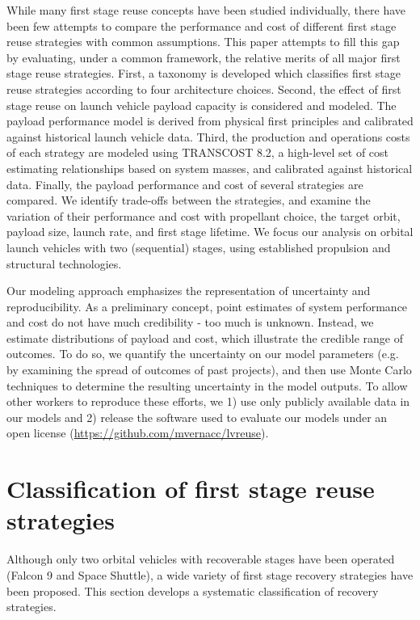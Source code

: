 \documentclass{iaf-iac}
\begin{document}
\begin{multicols}{2}
While many first stage reuse concepts have been studied individually, there have been few attempts to compare the performance and cost of different first stage reuse strategies with common assumptions. This paper attempts to fill this gap by evaluating, under a common framework, the relative merits of all major first stage reuse strategies. First, a taxonomy is developed which classifies first stage reuse strategies according to four architecture choices. Second, the effect of first stage reuse on launch vehicle payload capacity is considered and modeled. The payload performance model is derived from physical first principles and calibrated against historical launch vehicle data. Third, the production and operations costs of each strategy are modeled using TRANSCOST 8.2, a high-level set of cost estimating relationships based on system masses, and calibrated against historical data. Finally, the payload performance and cost of several strategies are compared. We identify trade-offs between the strategies, and examine the variation of their performance and cost with propellant choice, the target orbit, payload size, launch rate, and first stage lifetime. We focus our analysis on orbital launch vehicles with two (sequential) stages, using established propulsion and structural technologies.

Our modeling approach emphasizes the representation of uncertainty and reproducibility. As a preliminary concept, point estimates of system performance and cost do not have much credibility - too much is unknown. Instead, we estimate distributions of payload and cost, which illustrate the credible range of outcomes. To do so, we quantify the uncertainty on our model parameters (e.g. by examining the spread of outcomes of past projects), and then use Monte Carlo techniques to determine the resulting uncertainty in the model outputs. To allow other workers to reproduce these efforts, we 1) use only publicly available data in our models and 2) release the software used to evaluate our models under an open license (\url{https://github.com/mvernacc/lvreuse}).

\section{Classification of first stage reuse strategies}
Although only two orbital vehicles with recoverable stages have been operated (Falcon 9 and Space Shuttle), a wide variety of first stage recovery strategies have been proposed. This section develops a systematic classification of recovery strategies.


\end{multicols}
\end{document}
